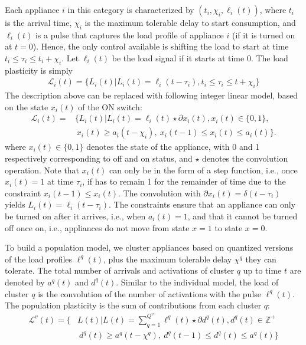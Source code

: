 \documentclass[10pt]{IEEEtran}
\begin{document}
Each appliance $i$ in this category is characterized by $(t_i,\chi_i,\ell_i(t))$, where $t_i$ is the arrival time, $\chi_i$ is the maximum tolerable delay to start consumption, and $\ell_i(t)$ is a pulse that captures the load profile of appliance $i$ (if it is turned on at $t=0$).
Hence, the only control available is shifting the load to start at time $t_i \leq \tau_i \leq t_i+\chi_i$. Let $\ell_i(t)$ be the load signal if it starts at time 0. The load
plasticity is simply \begin{align}
{\mathcal L}_i(t)=\{L_i(t)| L_i(t)=\ell_i(t-\tau_i),t_i \leq \tau_i \leq t + \chi_i\}
\end{align}
The description above can be replaced with following integer linear model, based on the state $x_i(t)$ of the ON switch:
\begin{align}
{\mathcal L}_i(t)=&\{L_i(t)| L_i(t)=\ell_i(t)\star \partial x_i(t), x_i(t) \in \{0,1\},\label{eq.defer}\\
	& ~x_i(t)\geq a_i(t-\chi_i), ~x_i(t-1)\leq x_i(t)\leq a_i(t) \}.\nonumber
\end{align}
where $x_i(t) \in \{0,1\}$ denotes the state of the appliance, with 0 and 1 respectively corresponding to off and on status, and $\star$ denotes the convolution operation.  
Note that $x_i(t)$ can only be in the form of a step function, i.e., once $x_i(t) = 1$ at time $\tau_i$, if has to remain 1 for the remainder of time due to the constraint $x_i(t-1)\leq x_i(t)$.   
The convolution with $\partial x_i(t)=\delta(t-\tau_i)$ yields
$L_i(t)=\ell_i(t-\tau_i).$ The constraints ensure that an appliance can only be turned on after it arrives, i.e., when $a_i(t) = 1$, and that it cannot be turned off once on, i.e., appliances do not move from state $x=1$ to state $x=0$.
 




To build a population model, we cluster appliances based on quantized versions of the load profiles $\ell^{q}(t)$, plus the maximum tolerable delay $\chi^q$ they can tolerate. The total number of arrivals and activations of cluster $q$ up to time $t$ are denoted by $a^q(t)$ and $d^q(t)$. Similar to the individual model, the load of cluster $q$ is the convolution of the number of activations with the pulse $\ell^q(t)$.
The population plasticity is the sum of contributions from each cluster $q$:
\begin{align}\label{lint}
{\mathcal L}^v(t) \!=\! \Big\{&L(t) |  L(t) \!= \!\sum_{q=1}^{Q^v} \ell^q(t)\star \partial d^q(t), d^q(t)\in\mathbb{Z}^+ \\ 
& ~d^q(t)\geq a^q(t-\chi^q), ~d^q(t-1)\leq d^q(t)\leq a^q(t)
\Big\} \nonumber
\end{align}
\end{document}

